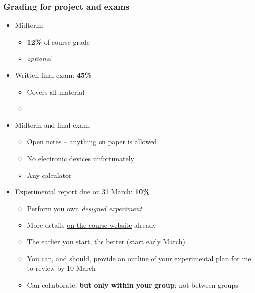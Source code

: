 \begin{frame}\frametitle{Grading for project and exams}
	\begin{itemize}
		\item	Midterm:
		\begin{itemize}
			\item	{\color{myBlue}\textbf{12\%}} of course grade
			\item	\emph{optional}
		\end{itemize}
	\end{itemize}
	\begin{itemize}
		\item	Written final exam: {\color{myBlue}\textbf{45\%}}
		\begin{itemize}
			\item	Covers all material
			\item	\textbf{{\color{myRed}{You must achieve 50\% or greater in final exam to pass 4C3/6C3}}}
		\end{itemize}
	\end{itemize}
	\begin{itemize}
		\item	Midterm and final exam:
		\begin{itemize}
			\item	Open notes -- anything on paper is allowed
			\item	No electronic devices unfortunately
			\item	Any calculator
		\end{itemize}
	\end{itemize}
	\begin{itemize}
		\item	Experimental report due on 31 March: {\color{myBlue}\textbf{10\%}}
		\begin{itemize}
			\item	Perform you own \emph{designed experiment}
			\item	More details \href{http://learnche.mcmaster.ca/4C3/Designed_experiments_project_-_2014}{on the course website} already
			\item	The earlier you start, the better (start early March)
			\item	You can, and should, provide an outline of your experimental plan for me to review by 10 March
			\item	Can collaborate, \textbf{but only within your group}: not between groups
		\end{itemize}
	\end{itemize}
\end{frame}


